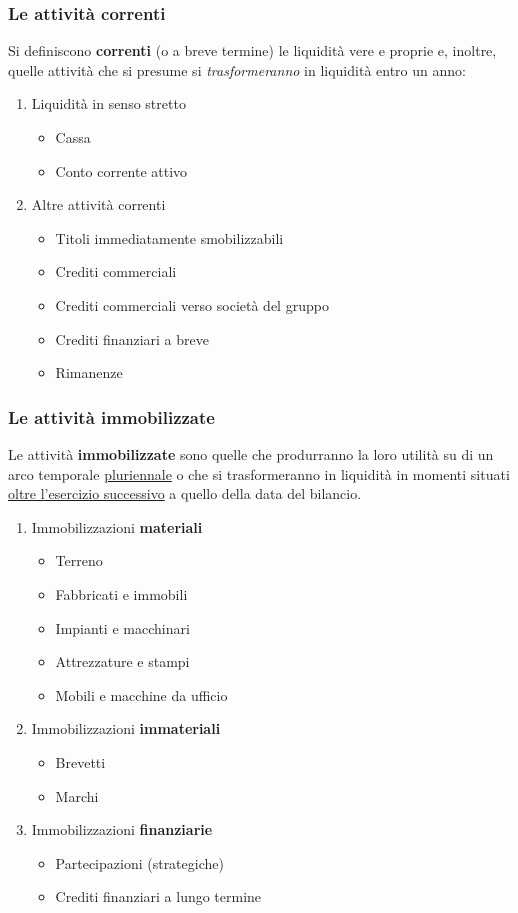 \documentclass{article}
\begin{document}
\subsubsection{Le attività correnti}
Si definiscono \textbf{correnti} (o a breve termine) le liquidità vere e proprie e,
inoltre, quelle attività che si presume si \textit{trasformeranno} in liquidità entro un anno:
\begin{enumerate}
    \item Liquidità in senso stretto
    \begin{itemize}
        \item Cassa
        \item Conto corrente attivo
    \end{itemize}
    \item Altre attività correnti
    \begin{itemize}
        \item Titoli immediatamente smobilizzabili
        \item Crediti commerciali
        \item Crediti commerciali verso società del gruppo
        \item Crediti finanziari a breve
        \item Rimanenze
    \end{itemize}
\end{enumerate}


\subsubsection{Le attività immobilizzate}
Le attività \textbf{immobilizzate} sono quelle che produrranno la loro utilità su di un arco temporale \underline{pluriennale} o che si
trasformeranno in liquidità in momenti situati \underline{oltre l'esercizio successivo} a quello della data del bilancio.
\begin{enumerate}
    \item Immobilizzazioni \textbf{materiali}
    \begin{itemize}
        \item Terreno
        \item Fabbricati e immobili
        \item Impianti e macchinari
        \item Attrezzature e stampi
        \item Mobili e macchine da ufficio 
    \end{itemize}
    \item Immobilizzazioni \textbf{immateriali}
    \begin{itemize}
        \item Brevetti
        \item Marchi
    \end{itemize}
    \item Immobilizzazioni \textbf{finanziarie} 
    \begin{itemize}
        \item Partecipazioni (strategiche)
        \item Crediti finanziari a lungo termine
    \end{itemize}
\end{enumerate}
\end{document}
